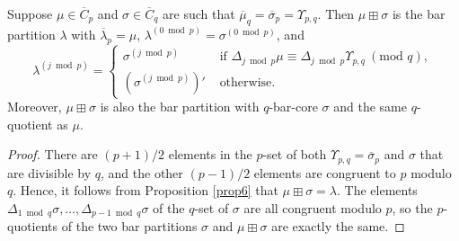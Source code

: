 \documentclass[ALCO, Unicode,published]{cedram}
\newcommand*\nicefrac[2]{#1/#2}
\begin{document}
\begin{prop}\label{sig1}
Suppose $\mu\in\overline{C}_p$ and $\sigma\in\overline{C}_q$ are such that $\overline{\mu}_q=\overline{\sigma}_p=\Upsilon_{p,q}$. Then $\mu\boxplus\sigma$ is the bar partition $\lambda$ with $\overline{\lambda}_p=\mu$, $\lambda^{(0\bmod p)}=\sigma^{(0\bmod p)}$, and $$\lambda^{(j\bmod p)}=\begin{cases}\sigma^{(j\bmod p)}&\text{ if }\Delta_{j\bmod p}\mu\equiv\Delta_{j\bmod p}\Upsilon_{p,q}\:(\text{mod }q),\\(\sigma^{(j\bmod p)})'&\text{ otherwise.}\end{cases}$$ 
Moreover, $\mu\boxplus\sigma$ is also the bar partition with $q$-bar-core $\sigma$ and the same $q$-quotient as $\mu$.  
\end{prop}
\begin{proof}
There are $\nicefrac{(p+1)}{2}$ elements in the $p$-set of both $\Upsilon_{p,q}=\overline{\sigma}_p$ and $\sigma$ that are divisible by $q$, and the other $\nicefrac{(p-1)}{2}$ elements are congruent to $p$ modulo $q$. Hence, it follows from Proposition \ref{prop6} that $\mu\boxplus\sigma=\lambda$. 
The elements $\Delta_{1\bmod q}\sigma,\dots,\Delta_{p-1\bmod q}\sigma$ of the $q$-set of $\sigma$ are all congruent modulo $p$, so the $p$-quotients of the two bar partitions $\sigma$ and $\mu\boxplus\sigma$ are exactly the same. 
\end{proof}
\end{document}
